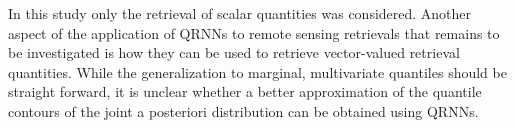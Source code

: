 \documentclass[journal abbreviation, manuscript]{copernicus}
\begin{document}
In this study only the retrieval of scalar quantities was considered. Another
aspect of the application of QRNNs to remote sensing retrievals that remains to
be investigated is how they can be used to retrieve vector-valued retrieval
quantities. While the generalization to marginal, multivariate quantiles should
be straight forward, it is unclear whether a better approximation of the
quantile contours of the joint a posteriori distribution can be obtained using
QRNNs.













%
\end{document}
